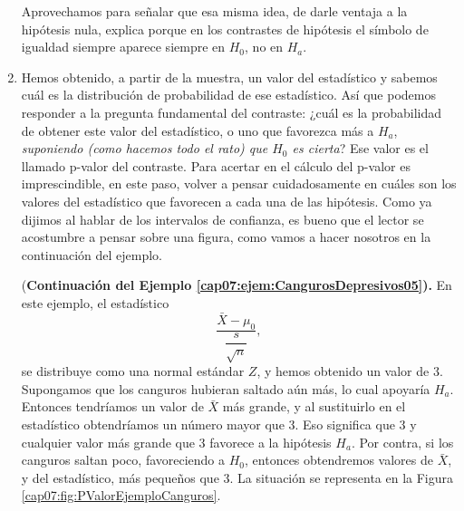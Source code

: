 \begin{enumerate}
         Aprovechamos para señalar que esa misma idea, de darle ventaja a la hipótesis nula, explica porque en los contrastes de hipótesis {\sf el símbolo de igualdad siempre aparece siempre en $H_0$}, no en $H_a$.

     \item Hemos obtenido, a partir de la muestra, un valor del estadístico y sabemos cuál es la distribución de probabilidad de ese estadístico. Así que podemos responder a la pregunta fundamental del contraste: ¿cuál es la probabilidad de obtener este valor del estadístico, o uno que favorezca más a $H_a$, {\em suponiendo (como hacemos todo el rato) que $H_0$ es cierta}? Ese valor es el llamado {\sf p-valor} del contraste. Para acertar en el cálculo del p-valor es imprescindible, en este paso, volver a pensar cuidadosamente en cuáles son los valores del estadístico que favorecen a cada una de las hipótesis. Como ya dijimos al hablar de los intervalos de confianza, es bueno que el lector se acostumbre a pensar sobre una figura, como vamos a hacer nosotros en la continuación del ejemplo.
         \begin{ejemplo}{(\bf Continuación del Ejemplo \ref{cap07:ejem:CangurosDepresivos05}).}
         \label{cap07:ejem:CangurosDepresivos06}
         En este ejemplo, el estadístico
         \[\dfrac{\bar X-\mu_0}{\dfrac{s}{\sqrt{n}}},\]
         se distribuye como una normal estándar $Z$, y hemos obtenido un valor de $3$. Supongamos que los canguros hubieran saltado aún más, lo cual apoyaría $H_a$. Entonces tendríamos un valor de $\bar X$ más grande, y al sustituirlo en el estadístico obtendríamos un número mayor que 3. Eso significa que $3$ y cualquier valor más grande que $3$ favorece a la hipótesis $H_a$. Por contra, si los canguros saltan poco, favoreciendo a $H_0$, entonces obtendremos valores de $\bar X$, y del estadístico, más pequeños que 3. La situación se representa en la Figura \ref{cap07:fig:PValorEjemploCanguros}.


\end{ejemplo}
\end{enumerate}
